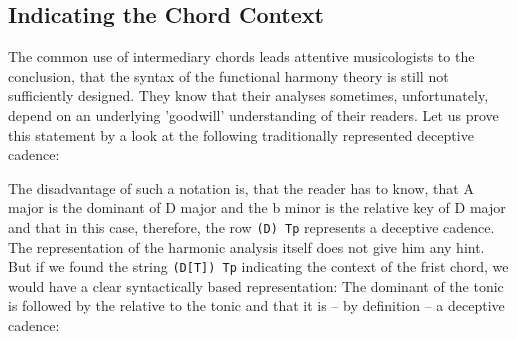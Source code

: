 \documentclass[
  DIV=calc,
  BCOR=5mm,
  12pt,
  headings=small,
  oneside,
  abstract=true,
  toc=bib,
  xcolor=dvipsnames,
  openany,
  english]{scrartcl}
\begin{document}
\subsection{Indicating the Chord Context}

The common use of intermediary chords leads attentive musicologists to the
conclusion, that the syntax of the functional harmony theory is still not
sufficiently designed. They know that their analyses sometimes, unfortunately,
depend on an underlying 'goodwill' understanding of their readers. Let us prove
this statement by a look at the following traditionally represented deceptive
cadence:

\begin{center}
\end{center}

The disadvantage of such a notation is, that the reader has to know, that A
major is the dominant of D major and the b minor is the relative key of D major
and that in this case, therefore, the row \texttt{(D) Tp} represents a deceptive
cadence. The representation of the harmonic analysis itself does not give him
any hint. But if we found the string \texttt{(D[T]) Tp} indicating the context
of the frist chord, we would have a clear syntactically based representation:
The dominant of the tonic is followed by the relative to the tonic and that it
is -- by definition -- a deceptive cadence:

\begin{center}
\end{center}
\end{document}
